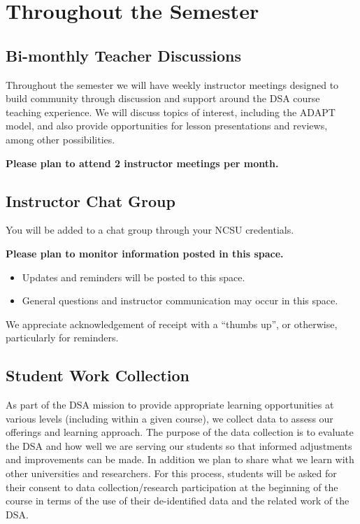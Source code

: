 \documentclass[
]{book}
\providecommand{\tightlist}{%
  \setlength{\itemsep}{0pt}\setlength{\parskip}{0pt}}
\begin{document}
\hypertarget{throughout-the-semester}{%
\section{Throughout the Semester}\label{throughout-the-semester}}

\hypertarget{bi-monthly-teacher-discussions}{%
\subsection{Bi-monthly Teacher Discussions}\label{bi-monthly-teacher-discussions}}

Throughout the semester we will have weekly instructor meetings designed to build community through discussion and support around the DSA course teaching experience. We will discuss topics of interest, including the ADAPT model, and also provide opportunities for lesson presentations and reviews, among other possibilities.

{ \textbf{Please plan to attend 2 instructor meetings per month.} }

\hypertarget{instructor-chat-group}{%
\subsection{Instructor Chat Group}\label{instructor-chat-group}}

You will be added to a chat group through your NCSU credentials.

{ \textbf{Please plan to monitor information posted in this space.} }

\begin{itemize}
\tightlist
\item
  Updates and reminders will be posted to this space.
\item
  General questions and instructor communication may occur in this space.
\end{itemize}

We appreciate acknowledgement of receipt with a ``thumbs up'', or otherwise, particularly for reminders.

\hypertarget{student-work-collection}{%
\subsection{Student Work Collection}\label{student-work-collection}}

As part of the DSA mission to provide appropriate learning opportunities at various levels (including within a given course), we collect data to assess our offerings and learning approach. The purpose of the data collection is to evaluate the DSA and how well we are serving our students so that informed adjustments and improvements can be made. In addition we plan to share what we learn with other universities and researchers. For this process, students will be asked for their consent to data collection/research participation at the beginning of the course in terms of the use of their de-identified data and the related work of the DSA.
\end{document}

